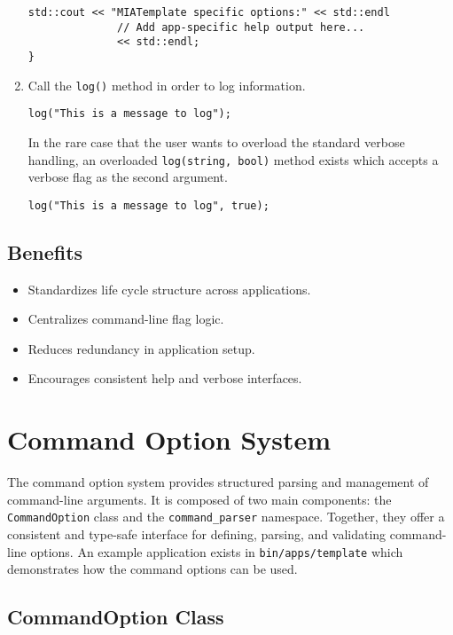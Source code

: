 \begin{enumerate}
\begin{lstlisting}[style=cppstyle]
    std::cout << "MIATemplate specific options:" << std::endl
              // Add app-specific help output here...
              << std::endl;
}
	\end{lstlisting}
	\item Call the \texttt{log()} method in order to log information.
	\begin{lstlisting}[style=cppstyle]
log("This is a message to log");
	\end{lstlisting}
	In the rare case that the user wants to overload the standard verbose handling, an overloaded \texttt{log(string, bool)} method exists which accepts a verbose flag as the second argument.
	\begin{lstlisting}[style=cppstyle]
log("This is a message to log", true);
	\end{lstlisting}
\end{enumerate}

\subsection*{Benefits}
\begin{itemize}
	\item Standardizes life cycle structure across applications.
	\item Centralizes command-line flag logic.
	\item Reduces redundancy in application setup.
	\item Encourages consistent help and verbose interfaces.
\end{itemize}










\section{Command Option System}

The command option system provides structured parsing and management of command-line arguments. It is composed of two main components: the \texttt{CommandOption} class and the \texttt{command\_parser} namespace. Together, they offer a consistent and type-safe interface for defining, parsing, and validating command-line options. An example application exists in \texttt{bin/apps/template} which demonstrates how the command options can be used.

\subsection{CommandOption Class}

